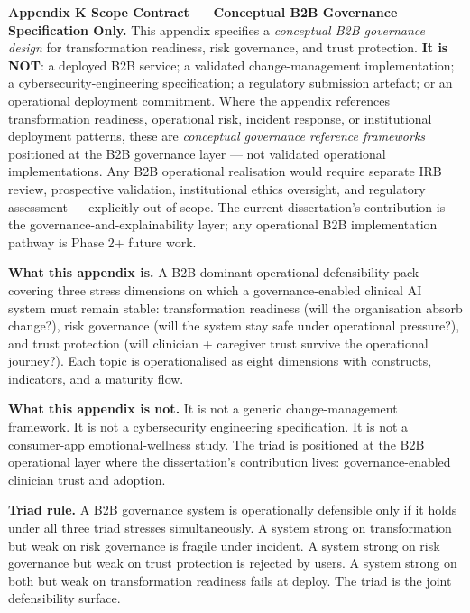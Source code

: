 \noindent\textbf{Appendix K Scope Contract --- Conceptual B2B Governance Specification Only.}
\label{para:appk_scope_contract}
This appendix specifies a \emph{conceptual B2B governance design} for transformation readiness, risk governance, and trust protection. \textbf{It is NOT}: a deployed B2B service; a validated change-management implementation; a cybersecurity-engineering specification; a regulatory submission artefact; or an operational deployment commitment. Where the appendix references transformation readiness, operational risk, incident response, or institutional deployment patterns, these are \emph{conceptual governance reference frameworks} positioned at the B2B governance layer --- not validated operational implementations. Any B2B operational realisation would require separate IRB review, prospective validation, institutional ethics oversight, and regulatory assessment --- explicitly out of scope. The current dissertation's contribution is the governance-and-explainability layer; any operational B2B implementation pathway is Phase 2+ future work.

\noindent\textbf{What this appendix is.} A B2B-dominant operational defensibility pack covering three stress dimensions on which a governance-enabled clinical AI system must remain stable: transformation readiness (will the organisation absorb change?), risk governance (will the system stay safe under operational pressure?), and trust protection (will clinician + caregiver trust survive the operational journey?). Each topic is operationalised as eight dimensions with constructs, indicators, and a maturity flow.

\noindent\textbf{What this appendix is not.} It is not a generic change-management framework. It is not a cybersecurity engineering specification. It is not a consumer-app emotional-wellness study. The triad is positioned at the B2B operational layer where the dissertation's contribution lives: governance-enabled clinician trust and adoption.

\noindent\textbf{Triad rule.} A B2B governance system is operationally defensible only if it holds under all three triad stresses simultaneously. A system strong on transformation but weak on risk governance is fragile under incident. A system strong on risk governance but weak on trust protection is rejected by users. A system strong on both but weak on transformation readiness fails at deploy. The triad is the joint defensibility surface.


